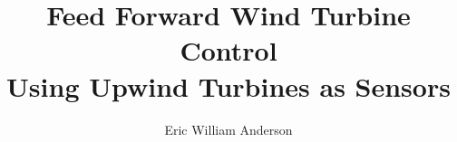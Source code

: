 \documentclass[12pt,draftcls]{ucdavisthesis}
\title          {Feed Forward Wind Turbine Control \\
				Using Upwind Turbines as Sensors}
\author         {Eric William Anderson}
\begin{document}
\renewcommand{\bibfont}{\singlespacing}

%

\makeintropages %













\appendix %










\label{Bibliography}




\end{document}
